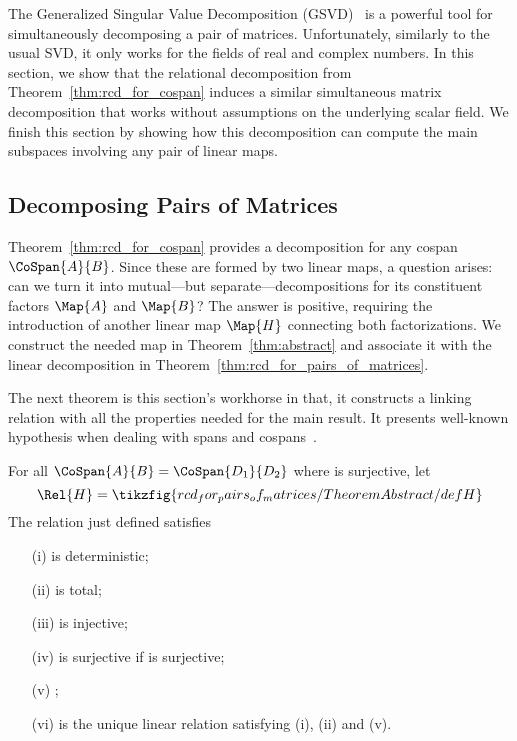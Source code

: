 \documentclass[manyauthors]{fundam}
\begin{document}
The Generalized Singular Value Decomposition (GSVD)~\cite{gsvd1976,gsvd1981}
is a powerful tool for simultaneously decomposing a pair of matrices.
Unfortunately, similarly to the usual SVD, it only works for the fields of real and complex numbers.
In this section, we show that the relational decomposition from Theorem~\ref{thm:rcd_for_cospan}
induces a similar simultaneous matrix decomposition that works without assumptions on the underlying scalar field.
We finish this section by showing how this decomposition can compute the main subspaces involving any pair of linear maps.

\subsection{Decomposing Pairs of Matrices}
\label{sec:decomposition_matrices}

Theorem~\ref{thm:rcd_for_cospan} provides a decomposition for any cospan $\CoSpan{A}{B}$.
Since these are formed by two linear maps, a question arises: can we turn it into mutual---but separate---decompositions for its constituent factors $\Map{A}$ and $\Map{B}$?
The answer is positive, requiring the introduction of another linear map $\Map{H}$ connecting both factorizations. We construct the needed map in Theorem~\ref{thm:abstract} and associate it with the linear decomposition in Theorem~\ref{thm:rcd_for_pairs_of_matrices}.

The next theorem is this section's workhorse
in that, it constructs a linking relation with all the properties needed for the main result. It presents well-known hypothesis when dealing with spans and cospans~\cite{freyd1990categories}.

\begin{theorem}\label{thm:abstract}
For all $\CoSpan{A}{B}=\CoSpan{D_1}{D_2}$
where  is surjective,
let
\begin{equation}
\Rel{H}=\tikzfig{rcd_for_pairs_of_matrices/TheoremAbstract/defH}
\end{equation}
The relation just defined satisfies
\begin{enumerate}
    \item[(i)]  is deterministic;
    \item[(ii)]  is total;
    \item[(iii)]  is injective;
    \item[(iv)]  is surjective if  is surjective;
    \item[(v)] ;
    \item[(vi)]  is the unique linear relation satisfying (i), (ii) and (v).
\end{enumerate}
\end{theorem}
\end{document}
